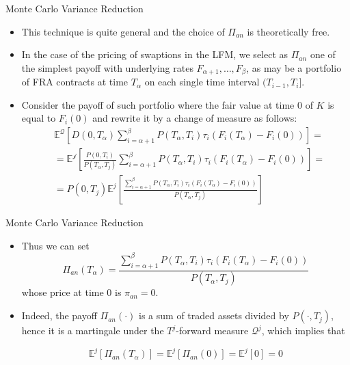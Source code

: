 \documentclass{beamer}
\begin{document}
\begin{frame}{Monte Carlo Variance Reduction}
\begin{itemize}
\item This technique is quite general and the choice of $\Pi_{an}$ is theoretically free.
\item In the case of the pricing of swaptions in the LFM, we select as $\Pi_{an}$ one of the simplest payoff with underlying rates $F_{\alpha+1},\ldots,F_\beta$, as may be a portfolio of FRA contracts at time $T_\alpha$ on each single time interval $(T_{i-1}, T_i]$.
\item Consider the payoff of such portfolio where the fair value at time 0 of $K$ is equal to $F_i(0)$ and rewrite it by a change of measure as follows:
\begin{equation*}
\begin{aligned}
&\mathbb{E}^\mathcal{Q}\left[D(0,T_\alpha)\sum_{i=\alpha+1}^\beta P(T_\alpha,T_i)\tau_i(F_i(T_\alpha) - F_i(0))\right] = \\
&=\mathbb{E}^\mathcal{j}\left[\frac{P(0,T_i)}{P(T_\alpha,T_j)}\sum_{i=\alpha+1}^\beta P(T_\alpha,T_i)\tau_i(F_i(T_\alpha) - F_i(0))\right] = \\
& = P(0,T_j)\mathbb{E}^j\left[\frac{\sum_{i=\alpha+1}^\beta P(T_\alpha,T_i)\tau_i(F_i(T_\alpha) - F_i(0))}{P(T_\alpha,T_j)}\right]
\end{aligned}
\end{equation*}
\end{itemize}
\end{frame}

\begin{frame}{Monte Carlo Variance Reduction}
\begin{itemize}
\item Thus we can set
\begin{equation*}
\Pi_{an}(T_\alpha) = \frac{\sum_{i=\alpha+1}^\beta P(T_\alpha,T_i)\tau_i(F_i(T_\alpha) - F_i(0))}{P(T_\alpha,T_j)}
\end{equation*}
whose price at time 0 is $\pi_{an} = 0$.
\item  Indeed, the payoff $\Pi_{an}(\cdot)$ is a sum of traded assets divided by $P(\cdot, T_j)$, hence it is a martingale under the $T^j$-forward measure $\mathcal{Q}^j$, which implies that

\begin{equation*}
\mathbb{E}^j[\Pi_{an}(T_\alpha)] = \mathbb{E}^j[\Pi_{an}(0)] = \mathbb{E}^j[0] = 0
\end{equation*}
\end{itemize}
\end{frame}
\end{document}

